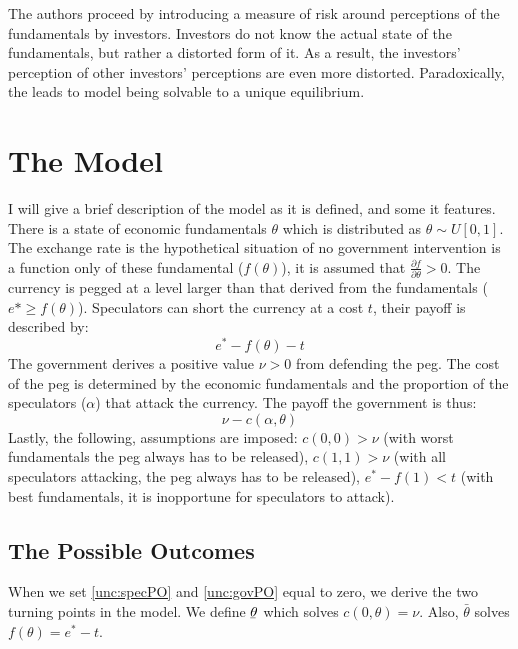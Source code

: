 \begin{refsection}
The authors proceed by introducing a measure of risk around perceptions of the fundamentals by investors.
Investors do not know the actual state of the fundamentals, but rather a distorted form of it.
As a result, the investors' perception of other investors' perceptions are even more distorted.
Paradoxically, the leads to model being solvable to a unique equilibrium.

\section{The Model}
\label{unc:model}
I will give a brief description of the model as it is defined, and some it features.
There is a state of economic fundamentals $\theta$ which is distributed as $\theta \sim U[0,1]$.
The exchange rate is the hypothetical situation of no government intervention is a function only of these fundamental ($f(\theta)$),
it is assumed that $\frac{\partial f}{\partial \theta} > 0$.
The currency is pegged at a level larger than that derived from the fundamentals ($e* \geq f(\theta)$).
Speculators can short the currency at a cost $t$, their payoff is described by:
\begin{equation}\label{unc:specPO}
e^* - f(\theta) - t
\end{equation}
The government derives a positive value $\nu > 0$ from defending the peg.
The cost of the peg is determined by the economic fundamentals and the proportion of the speculators ($\alpha$) that attack the currency.
The payoff the government is thus:
\begin{equation}\label{unc:govPO}
\nu - c(\alpha, \theta)
\end{equation}
Lastly, the following, assumptions are imposed: $c(0,0) > \nu$ (with worst fundamentals the peg always has to be released),
$c(1,1) > \nu$ (with all speculators attacking, the peg always has to be released),
$e^* - f(1) < t$ (with best fundamentals, it is inopportune for speculators to attack).

\subsection{The Possible Outcomes}
When we set \autoref{unc:specPO} and \autoref{unc:govPO} equal to zero,
we derive the two turning points in the model.
We define $\underaccent{\bar}{\theta}$ which solves $c(0, \theta) = \nu$.
Also, $\bar{\theta}$ solves $f(\theta) = e^* - t$.


\end{refsection}
